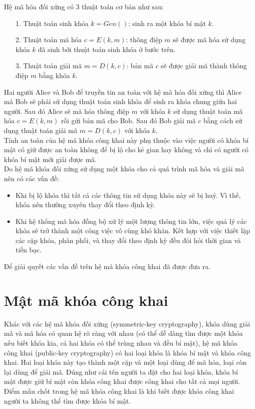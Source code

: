 \documentclass[a4paper,12pt]{report}
\begin{document}
Hệ mã hóa đối xứng có 3 thuật toán cơ bản như sau:
\begin{itemize}
\item[1. ] Thuật toán sinh khóa $k = Gen()$: sinh ra một khóa bí mật $k$. 

\item[2. ] Thuật toán mã hóa $c = E(k,m)$: thông điệp $m$ sẽ được mã hóa sử dụng khóa $k$ đã sinh bởi thuật toán sinh khóa ở bước trên.

\item[3. ] Thuật toán giải mã $m = D(k,c)$: bản mã $c$ sẽ được giải mã thành thông điệp $m$ bằng khóa $k$.  
\end{itemize}

Hai người Alice và Bob để truyền tin an toàn với hệ mã hóa đối xứng thì Alice mà Bob sẽ phải sử dụng thuật toán sinh khóa để sinh ra khóa chung giữa hai người. Sau đó Alice sẽ mã hóa thông điệp $m$ với khóa $k$ sử dụng thuật toán mã hóa $c = E(k, m)$ rồi gửi bản mã cho Bob. Sau đó Bob giải mã $c$ bằng cách sử dụng thuật toán giải mã $m = D(k,c)$ với khóa $k$. \\

Tính an toàn của hệ mã khóa công khai này phụ thuộc vào việc người có khóa bí mật có giữ được an toàn không để bị lộ cho kẻ gian hay không và chỉ có người có khóa bí mật mới giải được mã.\\

Do hệ mã khóa đối xứng sử dụng một khóa cho cả quá trình mã hóa và giải mã nên có các vấn đề:
\begin{itemize}
\item Khi bị lộ khóa thì tất cả các thông tin sử dụng khóa này sẽ bị huỷ. Vì thế, khóa nên thường xuyên thay đổi theo định kỳ.
\item Khi hệ thống mã hóa đồng bộ xử lý một lượng thông tin lớn, việc quả lý các khóa sẽ trở thành một công việc vô cùng khó khăn. Kết hợp với việc thiết lặp các cặp khóa, phân phối, và thay đổi theo định kỳ đều đòi hỏi thời gian và tiền bạc.
\end{itemize}

Để giải quyết các vấn đề trên hệ mã khóa công khai đã được đưa ra.
\section{Mật mã khóa công khai}
Khác với các hệ mã khóa đối xứng  (symmetric-key cryptography), khóa dùng giải mã và mã hóa có quan hệ rõ ràng với nhau (có thể dễ dàng tìm được một khóa nếu biết khóa kia, cả hai khóa có thể trùng nhau và đều bí mật), hệ mã khóa công khai  (public-key cryptography) có hai loại khóa là khóa bí mật và khóa công khai. Hai loại khóa này tạo thành một cặp và một loại dùng để mã hóa, loại còn lại dùng để giải mã. Đúng như cái tên người ta đặt cho hai loại khóa, khóa bí mật được giữ bí mật còn khóa công khai được công khai cho tất cả mọi người. Điểm mấu chốt trong hệ mã khóa công khai là khi biết được khóa công khai người ta không thể tìm được khóa bí mật.
\end{document}
